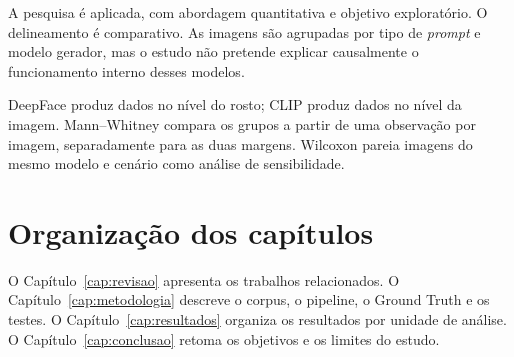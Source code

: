 A pesquisa é aplicada, com abordagem quantitativa e objetivo exploratório. O delineamento é comparativo. As imagens são agrupadas por tipo de \textit{prompt} e modelo gerador, mas o estudo não pretende explicar causalmente o funcionamento interno desses modelos.

DeepFace produz dados no nível do rosto; CLIP produz dados no nível da imagem. Mann--Whitney compara os grupos a partir de uma observação por imagem, separadamente para as duas margens. Wilcoxon pareia imagens do mesmo modelo e cenário como análise de sensibilidade.

\section{Organização dos capítulos}

O Capítulo~\ref{cap:revisao} apresenta os trabalhos relacionados. O Capítulo~\ref{cap:metodologia} descreve o corpus, o pipeline, o Ground Truth e os testes. O Capítulo~\ref{cap:resultados} organiza os resultados por unidade de análise. O Capítulo~\ref{cap:conclusao} retoma os objetivos e os limites do estudo.
